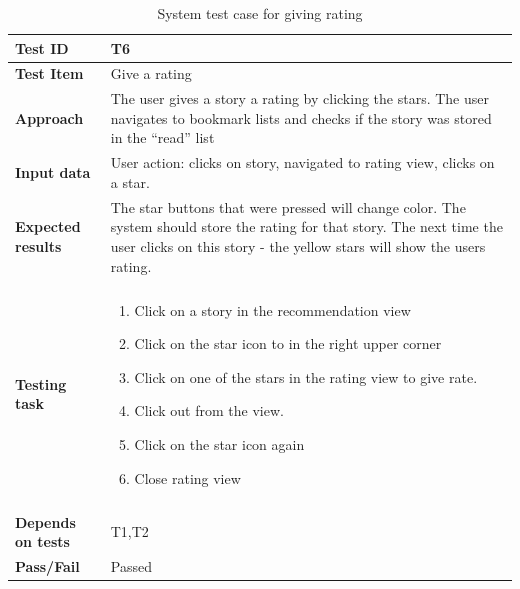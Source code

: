 \begin{appendices}
\begin{table}[H]
	\label{Tab:systemTesting5}
	\end{table}
	


	\begin{table}[H]
		\centering
		\caption{System test case for giving rating}
		\begin{tabular}{ | l | l  |}
			\hline
			\textbf{Test ID} & T6  \\ \hline
			\textbf{Test Item} & Give a rating \\ \hline
			\textbf{Approach} & \begin{minipage}{5in}The user gives a story a rating by clicking the stars. The user navigates to bookmark lists and checks if the story was stored in the “read” list \end{minipage}\\ \hline
			\textbf{Input data} &  \begin{minipage}{5in}User action: clicks on story, navigated to rating view, clicks on a star. \end{minipage}\\ \hline
			\textbf{Expected results} & \begin{minipage}{5in}The star buttons that were pressed will change color.  The system should store the rating for that story. The next time the user clicks on this story - the yellow stars will show the users rating.  \end{minipage}\\ \hline&\\[-3.8ex]
			\textbf{Testing task} & \begin{minipage}{5in}
			\begin{enumerate}[noitemsep]
			\item Click on a story in the recommendation view
			\item Click on the star icon to in the right upper corner
			\item Click on one of the stars in the rating view to give rate.
			\item Click out from the view. 
			\item Click on the star icon again
			\item Close rating view
			\end{enumerate}\end{minipage}
			\\ &\\[-3.8ex]\hline
			\textbf{Depends on tests} & T1,T2 \\ \hline		
			\textbf{Pass/Fail} & Passed \\\hline			
		\end{tabular}
	\label{Tab_systemTesting6}
	\end{table}





\end{appendices}
